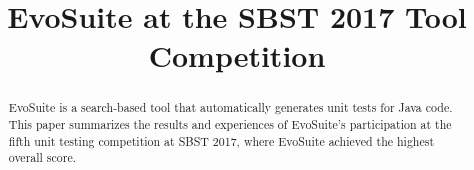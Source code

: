 \documentclass[10pt,conference]{IEEEtran}
\newcommand{\EVOSUITE}{{\sc EvoSuite}\xspace}
\begin{document}
% 

\title{EvoSuite at the SBST 2017 Tool Competition}
 

\author{
\and
{}
}

\maketitle

\begin{abstract}
  \EVOSUITE is a search-based tool that automatically generates unit
  tests for Java code.  This paper summarizes the results and
  experiences of \EVOSUITE's participation at the fifth unit testing
  competition at SBST 2017, where \EVOSUITE achieved the highest
  overall score.
\end{abstract}



\end{document}
